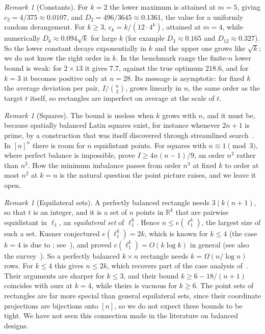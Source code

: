 \documentclass[11pt]{article}
\theoremstyle{plain}
\theoremstyle{definition}
\theoremstyle{remark}
\newtheorem{remark}[theorem]{Remark}
\newcommand{\R}{\mathbb{R}}
\begin{document}
\begin{remark}[Constants]\label{rem:constants}
For $k=2$ the lower maximum is attained at $m=5$, giving $c_2=4/375\approx0.0107$, and
$D_2=496/3645\approx0.1361$, the value for a uniformly random derangement. For $k\ge3$,
$c_k=k/(12\cdot4^k)$, attained at $m=4$, while numerically $D_k\approx0.094\sqrt k$ for large $k$
(for example $D_3\approx0.165$ and $D_{12}\approx0.327$). So the lower constant decays
exponentially in $k$ and the upper one grows like $\sqrt k$; we do not know the right order in $k$.
In the benchmark range the finite-$n$ lower bound is weak: for $2\times13$ it gives $7.7$, against
the true optimum $218.6$, and for $k=3$ it becomes positive only at $n=28$. Its message is
asymptotic: for fixed $k$ the average deviation per pair, $I/\binom n2$, grows linearly in $n$, the
same order as the target $t$ itself, so rectangles are imperfect on average at the scale of $t$.
\end{remark}

\begin{remark}[Squares]
The bound is useless when $k$ grows with $n$, and it must be, because spatially balanced Latin
squares exist, for instance whenever $2n+1$ is prime, by a construction that was itself
discovered through streamlined search~\citep{LeBrasGomesSelman2012}. In $[n]^n$ there is room for
$n$ equidistant points. For squares with $n\equiv1\pmod3$, where perfect balance is impossible,
\citet{XiaEtAl2026} prove $I\ge4n(n-1)/9$, an order $n^2$ rather than $n^3$. How the minimum
imbalance passes from order $n^3$ at fixed $k$ to order at most $n^2$ at $k=n$ is the natural
question the point picture raises, and we leave it open.
\end{remark}

\begin{remark}[Equilateral sets]\label{rem:equilateral}
A perfectly balanced rectangle needs $3\mid k(n+1)$, so that $t$ is an integer, and it is a set of
$n$ points in $\R^k$ that are pairwise equidistant in $\ell_1$, an \emph{equilateral set} of
$\ell_1^k$. Hence $n\le e(\ell_1^k)$, the largest size of such a set. Kusner conjectured
$e(\ell_1^k)=2k$, which is known for $k\le4$ (the case $k=4$ is due
to \citet{KoolenLaurentSchrijver2000}; see~\citep{Swanepoel2004}), and \citet{AlonPudlak2003}
proved $e(\ell_1^k)=O(k\log k)$ in general (see also the survey~\citep{Swanepoel2004}). So a
perfectly balanced $k\times n$ rectangle needs $k=\Omega(n/\log n)$ rows. For $k\le4$ this gives
$n\le2k$, which recovers part of the case analysis of~\citet{DiazLeBrasGomes2017}. Their
arguments are sharper for $k\le 3$, and their bound $k\ge 6-18/(n+1)$ coincides with ours at
$k=4$, while theirs is vacuous for $k\ge6$. The point sets of rectangles are far more special than
general equilateral sets, since their coordinate projections are bijections onto $[n]$, so we do
not expect these bounds to be tight. We have not seen this connection made in the literature on
balanced designs.
\end{remark}
\end{document}
